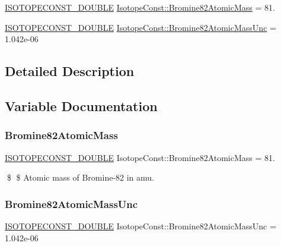 \begin{DoxyCompactItemize}
\item 
\mbox{\hyperlink{group___isotope_const-_macros_ga8f45a7272ce02c0b4c65c44636ed719a}{I\+S\+O\+T\+O\+P\+E\+C\+O\+N\+S\+T\+\_\+\+D\+O\+U\+B\+LE}} \mbox{\hyperlink{group___isotope_const-_bromine-_br82_ga82895cd2073029a2ef64c529c36ac24e}{Isotope\+Const\+::\+Bromine82\+Atomic\+Mass}} = 81.
\item 
\mbox{\hyperlink{group___isotope_const-_macros_ga8f45a7272ce02c0b4c65c44636ed719a}{I\+S\+O\+T\+O\+P\+E\+C\+O\+N\+S\+T\+\_\+\+D\+O\+U\+B\+LE}} \mbox{\hyperlink{group___isotope_const-_bromine-_br82_ga59dfdb2ebe6aa8ead5bf3b7f673aae92}{Isotope\+Const\+::\+Bromine82\+Atomic\+Mass\+Unc}} = 1.\+042e-\/06
\end{DoxyCompactItemize}


\subsection{Detailed Description}


\subsection{Variable Documentation}
\mbox{\label{group___isotope_const-_bromine-_br82_ga82895cd2073029a2ef64c529c36ac24e}} 
\subsubsection{\texorpdfstring{Bromine82\+Atomic\+Mass}{Bromine82AtomicMass}}
{\footnotesize\ttfamily \mbox{\hyperlink{group___isotope_const-_macros_ga8f45a7272ce02c0b4c65c44636ed719a}{I\+S\+O\+T\+O\+P\+E\+C\+O\+N\+S\+T\+\_\+\+D\+O\+U\+B\+LE}} Isotope\+Const\+::\+Bromine82\+Atomic\+Mass = 81.}

\$ \$ Atomic mass of Bromine-\/82 in amu. \mbox{\label{group___isotope_const-_bromine-_br82_ga59dfdb2ebe6aa8ead5bf3b7f673aae92}} 
\subsubsection{\texorpdfstring{Bromine82\+Atomic\+Mass\+Unc}{Bromine82AtomicMassUnc}}
{\footnotesize\ttfamily \mbox{\hyperlink{group___isotope_const-_macros_ga8f45a7272ce02c0b4c65c44636ed719a}{I\+S\+O\+T\+O\+P\+E\+C\+O\+N\+S\+T\+\_\+\+D\+O\+U\+B\+LE}} Isotope\+Const\+::\+Bromine82\+Atomic\+Mass\+Unc = 1.\+042e-\/06}


